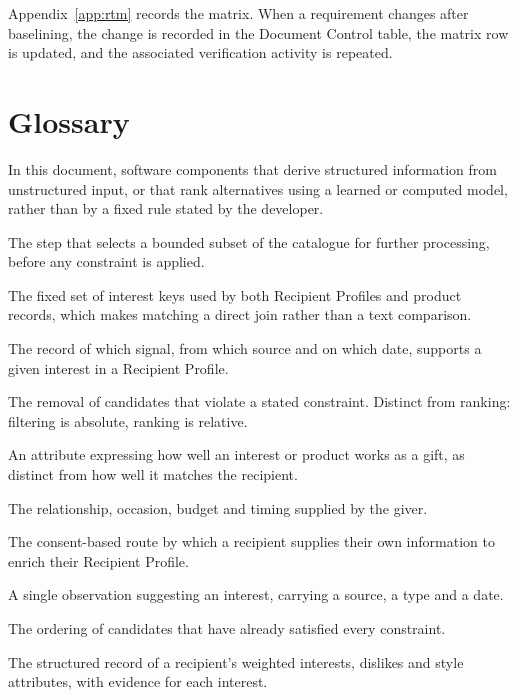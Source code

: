 \documentclass[11pt,a4paper]{report}
\begin{document}
\noindent Appendix~\ref{app:rtm} records the matrix. When a requirement changes after
baselining, the change is recorded in the Document Control table, the matrix row is updated,
and the associated verification activity is repeated.

\appendix

\chapter{Glossary}
\label{app:glossary}
\begin{description}[style=nextline,leftmargin=0pt]
\item[Artificial intelligence (AI)] In this document, software components that derive structured information from unstructured input, or that rank alternatives using a learned or computed model, rather than by a fixed rule stated by the developer.
\item[Candidate retrieval] The step that selects a bounded subset of the catalogue for further processing, before any constraint is applied.
\item[Controlled interest vocabulary] The fixed set of interest keys used by both Recipient Profiles and product records, which makes matching a direct join rather than a text comparison.
\item[Evidence] The record of which signal, from which source and on which date, supports a given interest in a Recipient Profile.
\item[Filtering] The removal of candidates that violate a stated constraint. Distinct from ranking: filtering is absolute, ranking is relative.
\item[Giftability] An attribute expressing how well an interest or product works as a gift, as distinct from how well it matches the recipient.
\item[Gift context] The relationship, occasion, budget and timing supplied by the giver.
\item[Gift Profile] The consent-based route by which a recipient supplies their own information to enrich their Recipient Profile.
\item[Interest signal] A single observation suggesting an interest, carrying a source, a type and a date.
\item[Ranking] The ordering of candidates that have already satisfied every constraint.
\item[Recipient Profile] The structured record of a recipient's weighted interests, dislikes and style attributes, with evidence for each interest.

\end{description}
\end{document}
